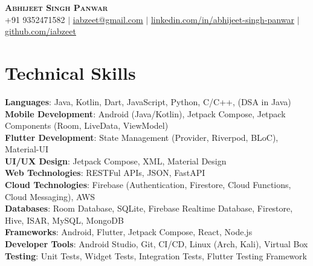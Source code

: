 \documentclass[letterpaper,11pt]{article}
\begin{document}

\begin{center}
    \textbf{\Huge \scshape Abhijeet Singh Panwar} \\ \vspace{1pt}
    \small +91 9352471582 $|$ \href{mailto:x@x.com}{\underline{iabzeet@gmail.com}} $|$ 
    \href{https://linkedin.com/in/...}{\underline{linkedin.com/in/abhijeet-singh-panwar}} $|$
    \href{https://github.com/...}{\underline{github.com/iabzeet}}
\end{center}

\section{Technical Skills}
 \begin{itemize}[leftmargin=0.15in, label={}]
    \small{\item{
     \textbf{Languages}{: Java, Kotlin, Dart, JavaScript, Python, C/C++, (DSA in Java)} \\
     \textbf{Mobile Development}{: Android (Java/Kotlin), Jetpack Compose, Jetpack Components (Room, LiveData, ViewModel)} \\
     \textbf{Flutter Development}{: State Management (Provider, Riverpod, BLoC), Material-UI} \\
     \textbf{UI/UX Design}{: Jetpack Compose, XML, Material Design} \\
     \textbf{Web Technologies}{: RESTFul APIs, JSON, FastAPI} \\
     \textbf{Cloud Technologies}{: Firebase (Authentication, Firestore, Cloud Functions, Cloud Messaging), AWS} \\
     \textbf{Databases}{: Room Database, SQLite, Firebase Realtime Database, Firestore, Hive, ISAR, MySQL, MongoDB} \\
     \textbf{Frameworks}{: Android, Flutter, Jetpack Compose, React, Node.js} \\
     \textbf{Developer Tools}{: Android Studio, Git, CI/CD, Linux (Arch, Kali), Virtual Box} \\
    \textbf{Testing}{: Unit Tests, Widget Tests, Integration Tests, Flutter Testing Framework} \\
    }}
 \end{itemize}
\end{document}
